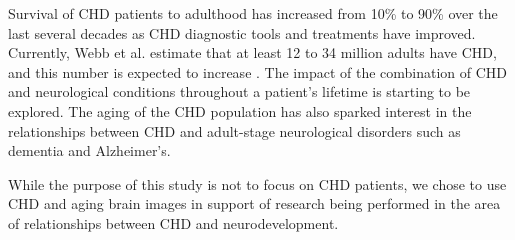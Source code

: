Survival of CHD patients to adulthood has increased from 10\% to 90\% over the last several decades as CHD diagnostic tools and treatments have improved.  Currently, Webb et al. estimate that at least 12 to 34 million adults have CHD, and this number is expected to increase \cite{Webb2015}. The impact of the combination of CHD and neurological conditions throughout a patient's lifetime is starting to be explored. The aging of the CHD population has also sparked interest in the relationships between CHD and adult-stage neurological disorders such as dementia and Alzheimer's. 

While the purpose of this study is not to focus on CHD patients, we chose to use CHD and aging brain images in support of research being performed in the area of relationships between CHD and neurodevelopment.



